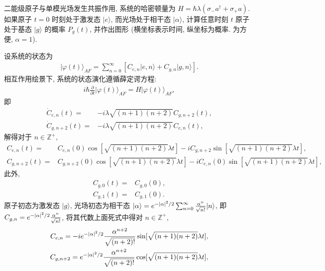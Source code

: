 \documentclass{assignment}
\begin{document}
\begin{prob}
    二能级原子与单模光场发生共振作用, 系统的哈密顿量为 $H=\hbar\lambda(\sigma_-a^{\dagger}+\sigma_+a)$. 如果原子 $t=0$ 时刻处于激发态 $\lvert e\rangle$, 而光场处于相干态 $\lvert\alpha\rangle$, 计算任意时刻 $t$ 原子处于基态 $\lvert g\rangle$ 的概率 $P_g(t)$, 并作出图形 (横坐标表示时间, 纵坐标为概率. 为方便, $\alpha=1$).
\end{prob}
\begin{sol}
    设系统的状态为
        \begin{align}
            \lvert\varphi(t)\rangle_{AF}=\sum_{n=0}^{\infty}[C_{e,n}\lvert e,n\rangle+C_{g,n}\lvert g,n\rangle].
        \end{align}
        相互作用绘景下, 系统的状态演化遵循薛定谔方程:
        \begin{align}
            i\hbar\frac{\partial}{\partial t}\lvert\varphi(t)\rangle_{AF}=H\lvert\varphi(t)\rangle_{AF},
        \end{align}
        即
        \begin{align}
            \dot{C}_{e,n}(t)=&-i\lambda\sqrt{(n+1)(n+2)}C_{g,n+2}(t),\\
            \dot{C}_{g,n+2}(t)=&-i\lambda\sqrt{(n+1)(n+2)}C_{e,n}(t),
        \end{align}
        解得对于 $n\in\mathbb{Z}^+$,
        \begin{align}
            C_{e,n}(t)=&C_{e,n}(0)\cos[\sqrt{(n+1)(n+2)}\lambda t]-iC_{g,n+2}\sin[\sqrt{(n+1)(n+2)}\lambda t],\\
            C_{g,n+2}(t)=&C_{g,n+2}(0)\cos[\sqrt{(n+1)(n+2)}\lambda t]-iC_{e,n}(0)\sin[\sqrt{(n+1)(n+2)}\lambda t],
        \end{align}
        此外,
        \begin{align}
            C_{g,0}(t)=&C_{g,0}(0),\\
            C_{g,1}(t)=&C_{g,1}(0).
        \end{align}
        原子初态为激发态 $\lvert g\rangle$, 光场初态为相干态 $\lvert\alpha\rangle=e^{-\left\lvert\alpha\right\rvert^2/2}\sum_{n=0}^{\infty}\frac{\alpha^n}{\sqrt{n!}}\lvert n\rangle$, 即 $C_{g,n}=e^{-\left\lvert\alpha\right\rvert^2/2}\frac{\alpha^n}{\sqrt{n!}}$, 将其代数上面死式中得对 $n\in\mathbb{Z}^+$,
        \begin{align}
            C_{e,n}=-ie^{-\abs{\alpha}^2/2}\frac{\alpha^{n+2}}{\sqrt{(n+2)!}}\sin[\sqrt{(n+1)(n+2)}\lambda t],\\
            C_{g,n+2}=e^{-\abs{\alpha}^2/2}\frac{\alpha^{n+2}}{\sqrt{(n+2)!}}\cos[\sqrt{(n+1)(n+2)}\lambda t],

\end{align}
\end{sol}
\end{document}
